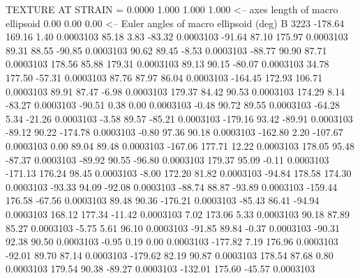 TEXTURE AT STRAIN =    0.0000
   1.000   1.000   1.000  <-- axes length of macro ellipsoid
    0.00    0.00    0.00  <-- Euler angles of macro ellipsoid (deg)
B      3223
     -178.64      169.16        1.40     0.0003103
       85.18        3.83      -83.32     0.0003103
      -91.64       87.10      175.97     0.0003103
       89.31       88.55      -90.85     0.0003103
       90.62       89.45       -8.53     0.0003103
      -88.77       90.90       87.71     0.0003103
      178.56       85.88      179.31     0.0003103
       89.13       90.15      -80.07     0.0003103
       34.78      177.50      -57.31     0.0003103
       87.76       87.97       86.04     0.0003103
     -164.45      172.93      106.71     0.0003103
       89.91       87.47       -6.98     0.0003103
      179.37       84.42       90.53     0.0003103
      174.29        8.14      -83.27     0.0003103
      -90.51        0.38        0.00     0.0003103
       -0.48       90.72       89.55     0.0003103
      -64.28        5.34      -21.26     0.0003103
       -3.58       89.57      -85.21     0.0003103
     -179.16       93.42      -89.91     0.0003103
      -89.12       90.22     -174.78     0.0003103
       -0.80       97.36       90.18     0.0003103
     -162.80        2.20     -107.67     0.0003103
        0.00       89.04       89.48     0.0003103
     -167.06      177.71       12.22     0.0003103
      178.05       95.48      -87.37     0.0003103
      -89.92       90.55      -96.80     0.0003103
      179.37       95.09       -0.11     0.0003103
     -171.13      176.24       98.45     0.0003103
       -8.00      172.20       81.82     0.0003103
      -94.84      178.58      174.30     0.0003103
      -93.33       94.09      -92.08     0.0003103
      -88.74       88.87      -93.89     0.0003103
     -159.44      176.58      -67.56     0.0003103
       89.48       90.36     -176.21     0.0003103
      -85.43       86.41      -94.94     0.0003103
      168.12      177.34      -11.42     0.0003103
        7.02      173.06        5.33     0.0003103
       90.18       87.89       85.27     0.0003103
       -5.75        5.61       96.10     0.0003103
      -91.85       89.84       -0.37     0.0003103
      -90.31       92.38       90.50     0.0003103
       -0.95        0.19        0.00     0.0003103
     -177.82        7.19      176.96     0.0003103
      -92.01       89.70       87.14     0.0003103
     -179.62       82.19       90.87     0.0003103
      178.54       87.68        0.80     0.0003103
      179.54       90.38      -89.27     0.0003103
     -132.01      175.60      -45.57     0.0003103
